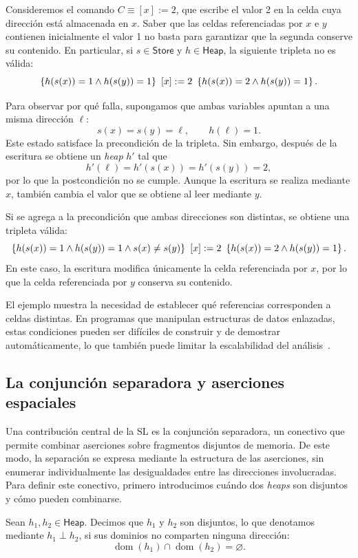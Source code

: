 \documentclass[a4paper,	11pt]{report}
\begin{document}
\begin{ejemplo}
Consideremos el comando $C \equiv [x] := 2$,
que escribe el valor 2 en la celda cuya dirección está almacenada en $x$.
Saber que las celdas referenciadas por $x$ e $y$ contienen inicialmente el valor 1
no basta para garantizar que la segunda conserve su contenido.
En particular,
si $s \in \mathsf{Store}$ y $h \in \mathsf{Heap}$,
la siguiente tripleta no es válida:
$$\left\{ h(s(x)) = 1 \land h(s(y)) = 1 \right\}~[x] := 2~\left\{ h(s(x)) = 2 \land h(s(y)) = 1 \right\}.$$

Para observar por qué falla,
supongamos que ambas variables apuntan a una misma dirección $\ell$:
$$s(x) = s(y) = \ell, \qquad h(\ell) = 1.$$
Este estado satisface la precondición de la tripleta.
Sin embargo,
después de la escritura se obtiene un \emph{heap} $h'$ tal que
$$h'(\ell) = h'(s(x)) = h'(s(y)) = 2,$$
por lo que la postcondición no se cumple.
Aunque la escritura se realiza mediante $x$,
también cambia el valor que se obtiene al leer mediante $y$.

Si se agrega a la precondición que ambas direcciones son distintas,
se obtiene una tripleta válida:
$$\left\{ h(s(x)) = 1 \land h(s(y)) = 1 \land s(x) \neq s(y) \right\}~[x] := 2~\left\{ h(s(x)) = 2 \land h(s(y)) = 1 \right\}.$$
En este caso,
la escritura modifica únicamente la celda referenciada por $x$,
por lo que la celda referenciada por $y$ conserva su contenido.
\end{ejemplo}

El ejemplo muestra la necesidad de establecer qué referencias corresponden a celdas distintas.
En programas que manipulan estructuras de datos enlazadas,
estas condiciones pueden ser difíciles de construir y de demostrar automáticamente,
lo que también puede limitar la escalabilidad del análisis~\citep{bttf}.

\subsection*{La conjunción separadora y aserciones espaciales}
Una contribución central de la SL es la conjunción separadora,
un conectivo que permite combinar aserciones sobre fragmentos disjuntos de memoria.
De este modo,
la separación se expresa mediante la estructura de las aserciones,
sin enumerar individualmente las desigualdades entre las direcciones involucradas.
Para definir este conectivo,
primero introducimos
cuándo dos \emph{heaps} son disjuntos y cómo pueden combinarse.

\begin{definicion}
\label{def:disj_heaps}
Sean $h_1, h_2 \in \mathsf{Heap}$.
Decimos que $h_1$ y $h_2$ son disjuntos,
lo que denotamos mediante $h_1 \perp h_2$,
si sus dominios no comparten ninguna dirección:
$$\operatorname{dom}(h_1) \cap \operatorname{dom}(h_2) = \varnothing.$$
\end{definicion}
\end{document}

